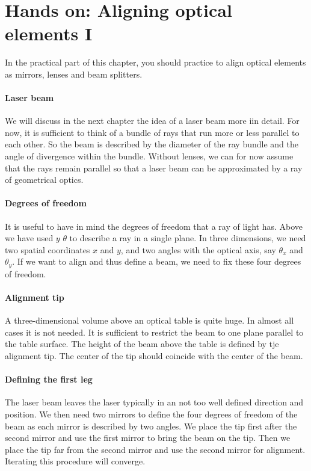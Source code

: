 \section {Hands on: Aligning optical elements I}

In the practical part of this chapter, you should practice to align optical elements as mirrors, lenses and beam splitters.

\paragraph*{Laser beam} We will discuss in the next chapter the idea of a laser beam more iin detail. For now, it is sufficient to think of a bundle of rays that run more or less parallel to each other. So the beam is described by the diameter of the ray bundle and the angle of divergence within the bundle. Without lenses, we can for now assume that the rays remain parallel so that a laser beam can be approximated by a ray of geometrical optics.

\paragraph*{Degrees of freedom} It is useful to have in mind the degrees of freedom that a ray of light has. Above we have used $y$ $\theta$ to describe a ray in a single plane. In three dimensions, we need two spatial coordinates $x$ and $y$, and two angles with the optical axis, say $\theta_x$ and $\theta_y$. If we want to align and thus define a beam, we need to fix these four degrees of freedom.

\paragraph*{Alignment tip} A three-dimensional volume above an optical table is quite huge. In almost all cases it is not needed. It is sufficient to restrict the beam to one plane parallel to the table surface. The height of the beam above the table is defined by tje alignment tip. The center of the tip should coincide with the center of the beam.

\paragraph*{Defining the first leg} The laser beam leaves the laser typically in an not too well defined direction and position. We then need two mirrors to define the four degrees of freedom of the beam as each mirror is described by two angles. We place the tip first after the second mirror and use the first mirror to bring the beam on the tip. Then we place the tip far from the second mirror and use the second mirror for alignment. Iterating this procedure will converge.

